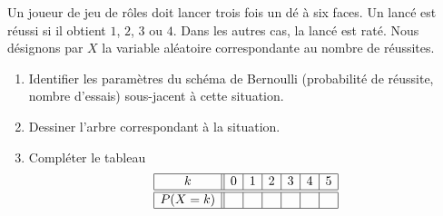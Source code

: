 
\begin{exercice}\label{exoPremiere-0086}

    Un joueur de jeu de rôles doit lancer trois fois un dé à six faces. Un lancé est réussi si il obtient \( 1\), \( 2\), \( 3\) ou \( 4\). Dans les autres cas, la lancé est raté. Nous désignons par \( X\) la variable aléatoire correspondante au nombre de réussites.
    \begin{enumerate}
        \item
            Identifier les paramètres du schéma de Bernoulli (probabilité de réussite, nombre d'essais) sous-jacent à cette situation.
        \item
            Dessiner l'arbre correspondant à la situation.
        \item
            Compléter le tableau
            \begin{equation*}
                \begin{array}[]{|c||c|c|c|c|c|c|}
                    \hline
                    k&0&1&2&3&4&5\\
                    \hline\hline
                    P(X=k)&&&&&&\\
                    \hline
                \end{array}
            \end{equation*}
    \end{enumerate}

\end{exercice}
